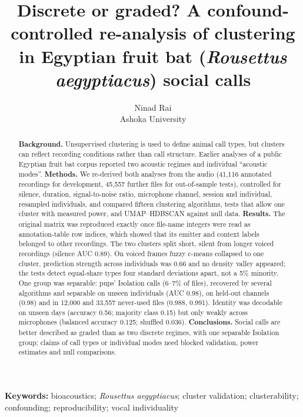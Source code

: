 ﻿\documentclass[10pt]{article}
\title{Discrete or graded? A confound-controlled re-analysis of clustering\\ in Egyptian fruit bat (\textit{Rousettus aegyptiacus}) social calls}
\author{Ninad Rai\\Ashoka University}
\date{}
\begin{document}
\maketitle
\vspace{-1.3em}

\begin{abstract}
\noindent\textbf{Background.} Unsupervised clustering is used to define animal call types, but clusters can reflect recording conditions rather than call structure. Earlier analyses of a public Egyptian fruit bat corpus reported two acoustic regimes and individual ``acoustic modes''.
\textbf{Methods.} We re-derived both analyses from the audio (41,116 annotated recordings for development, 45,557 further files for out-of-sample tests), controlled for silence, duration, signal-to-noise ratio, microphone channel, session and individual, resampled individuals, and compared fifteen clustering algorithms, tests that allow one cluster with measured power, and UMAP--HDBSCAN against null data.
\textbf{Results.} The original matrix was reproduced exactly once file-name integers were read as annotation-table row indices, which showed that its emitter and context labels belonged to other recordings. The two clusters split short, silent from longer voiced recordings (silence AUC 0.89). On voiced frames fuzzy c-means collapsed to one cluster, prediction strength across individuals was 0.66 and no density valley appeared; the tests detect equal-share types four standard deviations apart, not a 5\% minority. One group was separable: pups' Isolation calls (6--7\% of files), recovered by several algorithms and separable on unseen individuals (AUC 0.98), on held-out channels (0.98) and in 12,000 and 33,557 never-used files (0.988, 0.991). Identity was decodable on unseen days (accuracy 0.56; majority class 0.15) but only weakly across microphones (balanced accuracy 0.125; shuffled 0.036).
\textbf{Conclusions.} Social calls are better described as graded than as two discrete regimes, with one separable Isolation group; claims of call types or individual modes need blocked validation, power estimates and null comparisons.
\end{abstract}
\vspace{-0.6em}

\noindent\textbf{Keywords:} bioacoustics; \emph{Rousettus aegyptiacus}; cluster validation; clusterability; confounding; reproducibility; vocal individuality









\begingroup\tightbib

\endgroup
\end{document}
